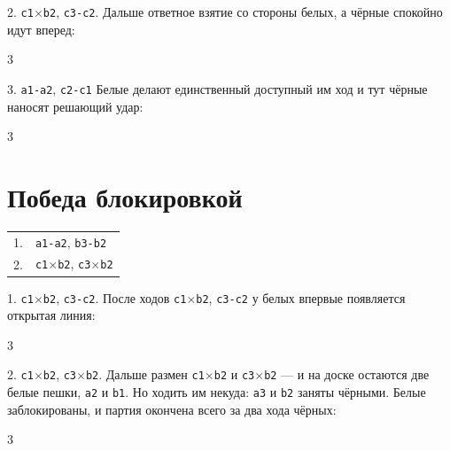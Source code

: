 \documentclass[12pt,a4paper]{article}
\begin{document}
2. \texttt{c1$\times$b2}, \texttt{c3-c2}.
Дальше ответное взятие со стороны белых, а чёрные спокойно идут вперед:
\begin{multicols}{3}
\columnbreak \par
{}
\columnbreak \par
{}
\end{multicols}

3. \texttt{a1-a2}, \texttt{c2-c1}
Белые делают единственный доступный им ход и тут чёрные наносят решающий удар:
\begin{multicols}{3}
\columnbreak \par
{}
\columnbreak \par
{}
\end{multicols}


\section*{Победа блокировкой}

\begin{center}
\begin{tabular}{ll}
1. & \texttt{a1-a2}, \texttt{b3-b2} \\
2. & \texttt{c1$\times$b2}, \texttt{c3$\times$b2}
\end{tabular}
\end{center}


1. \texttt{c1$\times$b2}, \texttt{c3-c2}.
После ходов \texttt{c1$\times$b2}, \texttt{c3-c2} у белых впервые появляется открытая линия:
\begin{multicols}{3}
\columnbreak \par
{}
\columnbreak \par
{}
\end{multicols}


2. \texttt{c1$\times$b2}, \texttt{c3$\times$b2}.
Дальше размен \texttt{c1$\times$b2} и \texttt{c3$\times$b2} --- и на доске остаются две белые пешки,
\texttt{a2} и \texttt{b1}.
Но ходить им некуда: \texttt{a3} и \texttt{b2} заняты чёрными.
Белые заблокированы, и партия окончена всего за два хода чёрных:
\begin{multicols}{3}
\columnbreak \par
{}
\columnbreak \par
{}
\end{multicols}
\end{document}
